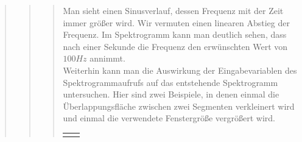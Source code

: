 \begin{quote}
\begin{quote}
\begin{quote}
                \vspace{1.5em}
        
        Man sieht einen Sinusverlauf, dessen Frequenz mit der Zeit immer größer
        wird. Wir vermuten einen linearen Abstieg der Frequenz. Im Spektrogramm
        kann man deutlich sehen, dass nach einer Sekunde die Frequenz den
        erwünschten Wert von $100 Hz$ annimmt.\\
        
        Weiterhin kann man die Auswirkung der Eingabevariablen des
        Spektrogrammaufrufs auf das entstehende Spektrogramm untersuchen. Hier
        sind zwei Beispiele, in denen einmal die Überlappungsfläche zwischen
        zwei Segmenten verkleinert wird und einmal die verwendete Fenstergröße
        vergrößert wird.
        
        
            \begin{center}
                \begin{tabular}{ll}
    
                \hspace{-12em}
                    \begin{minipage}{0.6\textwidth}
    

\end{minipage}
\end{tabular}
\end{center}
\end{quote}
\end{quote}
\end{quote}
